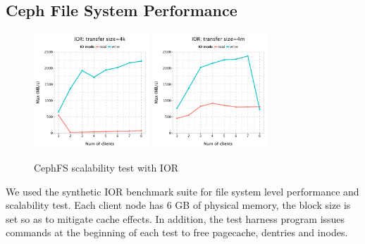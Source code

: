 \subsection{Ceph File System Performance}
\label{sec:ior-initial}

\begin{figure}[!t]

\centerline{\subfloat[4 KB transfer size]
{\includegraphics[width=1.7in]{data/ior_4k}
\label{fig:ior4k}}
\hfil
\subfloat[4 MB transfer size]
{\includegraphics[width=1.7in]{data/ior_4m}
\label{fig:ior4m}}
}%
\caption{CephFS scalability test with IOR}

\end{figure}


We used the synthetic IOR benchmark
suite\cite{ior} for file system
level performance and scalability test.  
Each client node has 6 GB of physical memory, the block
size is set so as to mitigate cache effects. In addition, the test harness
program issues commands at the beginning of each test to free pagecache,
dentries and inodes.


